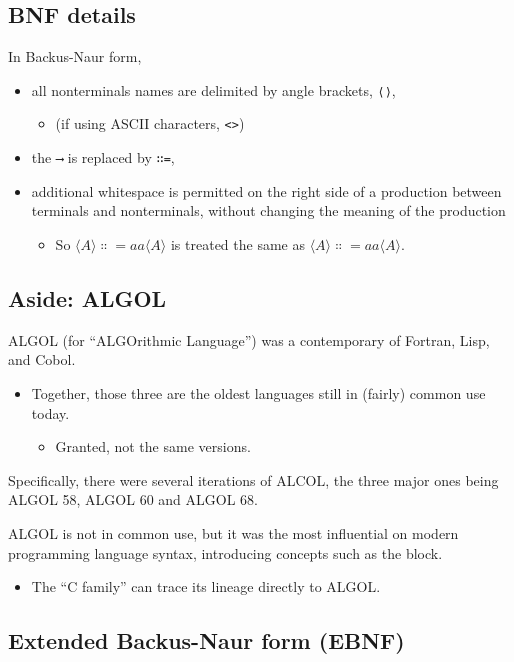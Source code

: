 \documentclass[11pt]{article}
\theoremstyle{definition}
\begin{document}
\subsection{BNF details}
\label{sec:org7010fcf}

In Backus-Naur form,
\begin{itemize}
\item all nonterminals names are delimited by
angle brackets, \texttt{⟨⟩},
\begin{itemize}
\item (if using ASCII characters, \texttt{<>})
\end{itemize}
\item the \texttt{⟶} is replaced by \texttt{∷=},
\item additional whitespace is permitted on the right side
of a production between terminals and nonterminals,
without changing the meaning of the production
\begin{itemize}
\item So \(⟨A⟩ ∷= a a ⟨A⟩\) is treated the same as \(⟨A⟩ ∷= aa⟨A⟩\).
\end{itemize}
\end{itemize}

\subsection{Aside: ALGOL}
\label{sec:org62ecdef}

ALGOL (for “ALGOrithmic Language”)
was a contemporary of Fortran, Lisp, and Cobol.
\begin{itemize}
\item Together, those three are the oldest languages
still in (fairly) common use today.
\begin{itemize}
\item Granted, not the same versions.
\end{itemize}
\end{itemize}

Specifically, there were several iterations of ALCOL,
the three major ones being ALGOL 58, ALGOL 60 and ALGOL 68.

ALGOL is not in common use, but it was
the most influential on modern programming language syntax,
introducing concepts such as the block.
\begin{itemize}
\item The “C family” can trace its lineage directly to ALGOL.
\end{itemize}

\subsection{Extended Backus-Naur form (EBNF)}
\label{sec:orgbed6517}
\end{document}
